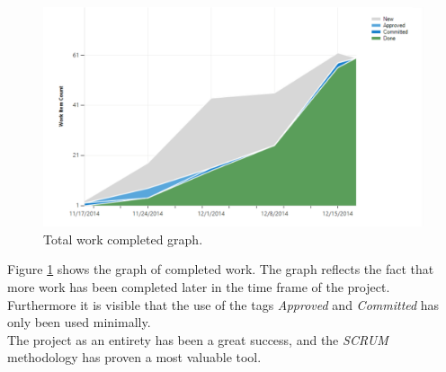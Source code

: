 \begin{figure}[H]
	\centering
	\includegraphics[width=\textwidth]{Figures/TotalGraph}
	\caption{Total work completed graph.}
	\label{fig:totalworkgraph}
\end{figure}
Figure \ref{fig:totalworkgraph} shows the graph of completed work. The graph reflects the fact that more work has been completed later in the time frame of the project. Furthermore it is visible that the use of the tags \textit{Approved} and \textit{Committed} has only been used minimally.\\

The project as an entirety has been a great success, and the \textit{SCRUM} methodology has proven a most valuable tool.